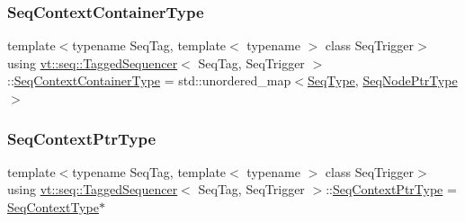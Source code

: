 \mbox{\label{structvt_1_1seq_1_1_tagged_sequencer_ad936050c5f6a8b28457e1056ed5dc57e}} 
\subsubsection{\texorpdfstring{Seq\+Context\+Container\+Type}{SeqContextContainerType}}
{\footnotesize\ttfamily template$<$typename Seq\+Tag, template$<$ typename $>$ class Seq\+Trigger$>$ \\
using \hyperlink{structvt_1_1seq_1_1_tagged_sequencer}{vt\+::seq\+::\+Tagged\+Sequencer}$<$ Seq\+Tag, Seq\+Trigger $>$\+::\hyperlink{structvt_1_1seq_1_1_tagged_sequencer_ad936050c5f6a8b28457e1056ed5dc57e}{Seq\+Context\+Container\+Type} =  std\+::unordered\+\_\+map$<$\hyperlink{structvt_1_1seq_1_1_tagged_sequencer_a1c8ee839258d0f88c49ef660267a81d5}{Seq\+Type}, \hyperlink{namespacevt_1_1seq_ae6a4874b585be0612aaca32ca6d2d191}{Seq\+Node\+Ptr\+Type}$>$}

\mbox{\label{structvt_1_1seq_1_1_tagged_sequencer_aba4239ea7f93cdd16765f1ddcc6a1a6b}} 
\subsubsection{\texorpdfstring{Seq\+Context\+Ptr\+Type}{SeqContextPtrType}}
{\footnotesize\ttfamily template$<$typename Seq\+Tag, template$<$ typename $>$ class Seq\+Trigger$>$ \\
using \hyperlink{structvt_1_1seq_1_1_tagged_sequencer}{vt\+::seq\+::\+Tagged\+Sequencer}$<$ Seq\+Tag, Seq\+Trigger $>$\+::\hyperlink{structvt_1_1seq_1_1_tagged_sequencer_aba4239ea7f93cdd16765f1ddcc6a1a6b}{Seq\+Context\+Ptr\+Type} =  \hyperlink{structvt_1_1seq_1_1_tagged_sequencer_a73020a327d57aa8eac042e558b1b2e30}{Seq\+Context\+Type}$\ast$}

\mbox{\label{structvt_1_1seq_1_1_tagged_sequencer_a73020a327d57aa8eac042e558b1b2e30}} 
